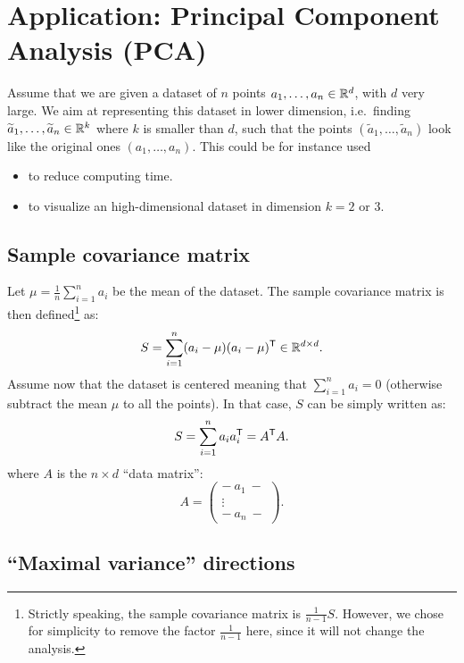 \documentclass[11pt,nocut]{article}
\begin{document}
\section{Application: Principal Component Analysis (PCA)}

Assume that we are given a dataset of $n$ points $a_1, \dots, a_n \in \mathbb{R}^d$, with $d$ very large. We aim at representing this dataset in lower dimension, i.e.\ finding $\widetilde{a}_1, \dots, \widetilde{a}_n \in \mathbb{R}^k$ where $k$ is smaller than $d$, such that the points $(\widetilde{a}_1, \dots, \widetilde{a}_n)$ look like the original ones $(a_1, \dots, a_n)$. This could be for instance used
\begin{itemize}
	\item to reduce computing time.
	\item to visualize an high-dimensional dataset in dimension $k=2$ or 3.
\end{itemize}

\subsection{Sample covariance matrix}

Let $\mu = \frac{1}{n} \sum_{i=1}^n a_i$ be the mean of the dataset. The sample covariance matrix is then defined\footnote{Strictly speaking, the sample covariance matrix is $\frac{1}{n-1}S$. However, we chose for simplicity to remove the factor $\frac{1}{n-1}$ here, since it will not change the analysis.} as:
$$
S = \sum_{i=1}^n (a_i - \mu) (a_i-\mu)^{{\sf T}} \in \mathbb{R}^{d \times d}.
$$
Assume now that the dataset is centered meaning that $\sum_{i=1}^n a_i = 0$ (otherwise subtract the mean $\mu$ to all the points). In that case, $S$ can be simply written as:
$$
S = \sum_{i=1}^n a_i a_i^{{\sf T}}
= A^{{\sf T}} A.
$$
where $A$ is the $n\times d$ ``data matrix'':
$$
A =
\begin{pmatrix}
	- \ a_1 \ - \\
	  \vdots  \\
	- \ a_n \ -
\end{pmatrix}
.
$$


\subsection{``Maximal variance'' directions}\label{sec:maximal_variance}
\end{document}
